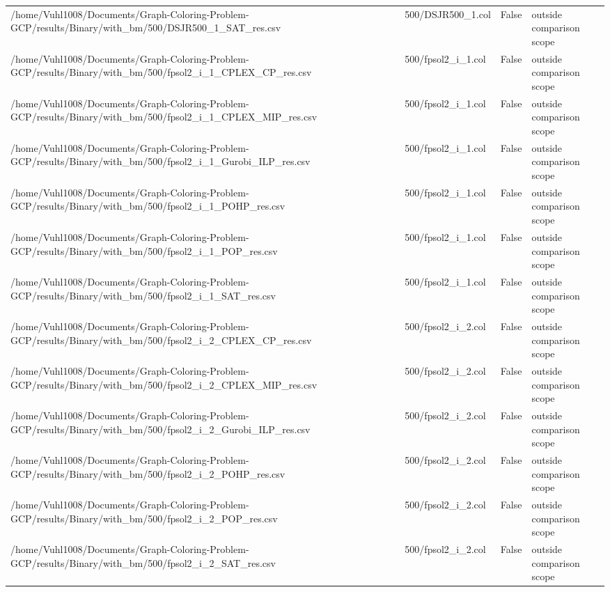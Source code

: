 \begin{table}[htbp]
\begin{tabular}{llll}
/home/Vuhl1008/Documents/Graph-Coloring-Problem-GCP/results/Binary/with\_bm/500/DSJR500\_1\_SAT\_res.csv & 500/DSJR500\_1.col & False & outside comparison scope \\
/home/Vuhl1008/Documents/Graph-Coloring-Problem-GCP/results/Binary/with\_bm/500/fpsol2\_i\_1\_CPLEX\_CP\_res.csv & 500/fpsol2\_i\_1.col & False & outside comparison scope \\
/home/Vuhl1008/Documents/Graph-Coloring-Problem-GCP/results/Binary/with\_bm/500/fpsol2\_i\_1\_CPLEX\_MIP\_res.csv & 500/fpsol2\_i\_1.col & False & outside comparison scope \\
/home/Vuhl1008/Documents/Graph-Coloring-Problem-GCP/results/Binary/with\_bm/500/fpsol2\_i\_1\_Gurobi\_ILP\_res.csv & 500/fpsol2\_i\_1.col & False & outside comparison scope \\
/home/Vuhl1008/Documents/Graph-Coloring-Problem-GCP/results/Binary/with\_bm/500/fpsol2\_i\_1\_POHP\_res.csv & 500/fpsol2\_i\_1.col & False & outside comparison scope \\
/home/Vuhl1008/Documents/Graph-Coloring-Problem-GCP/results/Binary/with\_bm/500/fpsol2\_i\_1\_POP\_res.csv & 500/fpsol2\_i\_1.col & False & outside comparison scope \\
/home/Vuhl1008/Documents/Graph-Coloring-Problem-GCP/results/Binary/with\_bm/500/fpsol2\_i\_1\_SAT\_res.csv & 500/fpsol2\_i\_1.col & False & outside comparison scope \\
/home/Vuhl1008/Documents/Graph-Coloring-Problem-GCP/results/Binary/with\_bm/500/fpsol2\_i\_2\_CPLEX\_CP\_res.csv & 500/fpsol2\_i\_2.col & False & outside comparison scope \\
/home/Vuhl1008/Documents/Graph-Coloring-Problem-GCP/results/Binary/with\_bm/500/fpsol2\_i\_2\_CPLEX\_MIP\_res.csv & 500/fpsol2\_i\_2.col & False & outside comparison scope \\
/home/Vuhl1008/Documents/Graph-Coloring-Problem-GCP/results/Binary/with\_bm/500/fpsol2\_i\_2\_Gurobi\_ILP\_res.csv & 500/fpsol2\_i\_2.col & False & outside comparison scope \\
/home/Vuhl1008/Documents/Graph-Coloring-Problem-GCP/results/Binary/with\_bm/500/fpsol2\_i\_2\_POHP\_res.csv & 500/fpsol2\_i\_2.col & False & outside comparison scope \\
/home/Vuhl1008/Documents/Graph-Coloring-Problem-GCP/results/Binary/with\_bm/500/fpsol2\_i\_2\_POP\_res.csv & 500/fpsol2\_i\_2.col & False & outside comparison scope \\
/home/Vuhl1008/Documents/Graph-Coloring-Problem-GCP/results/Binary/with\_bm/500/fpsol2\_i\_2\_SAT\_res.csv & 500/fpsol2\_i\_2.col & False & outside comparison scope \\

\end{tabular}
\end{table}
